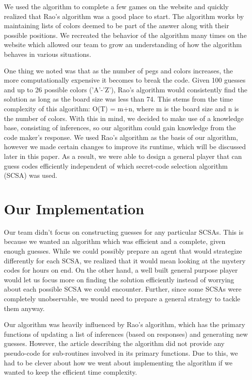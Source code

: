 \documentclass[11pt]{article}
\begin{document}
    We used the algorithm to complete a few games on the website and quickly realized that Rao's algorithm was a good place to start. The algorithm works by maintaining lists of colors deemed to be part of the answer along with their possible positions. We recreated the behavior of the algorithm many times on the website\autocite{webgames} which allowed our team to grow an understanding of how the algorithm behaves in various situations.

    One thing we noted was that as the number of pegs and colors increases, the more computationally expensive it becomes to break the code. Given 100 guesses and up to 26 possible colors ('A'-'Z'), Rao’s algorithm would consistently find the solution as long as the board size was less than 74. This stems from the time complexity of this algorithm: O(T) = m+n, where m is the board size and n is the number of colors. With this in mind, we decided to make use of a knowledge base, consisting of inferences, so our algorithm could gain knowledge from the code maker’s response. We used Rao’s algorithm as the basis of our algorithm, however we made certain changes to improve its runtime, which will be discussed later in this paper. As a result, we were able to design a general player that can guess codes efficiently independent of which secret-code selection algorithm (SCSA) was used.

    \section{Our Implementation}

    Our team didn’t focus on constructing guesses for any particular SCSAs. This is because we wanted an algorithm which was efficient and a complete, given enough guesses. While we could possibly prepare an agent that would strategize differently for each SCSA, we realized that it would mean looking at the mystery codes for hours on end. On the other hand, a well built general purpose player would let us focus more on finding the solution efficiently instead of worrying about each possible SCSA we could encounter. Further, since some SCSAs were completely unobservable, we would need to prepare a general strategy to tackle them anyway.

    Our algorithm was heavily influenced by Rao’s algorithm, which has the primary functions of updating a list of inferences (based on responses) and generating new guesses. However, the article describing the algorithm did not provide any pseudo-code for sub-routines involved in its primary functions. Due to this, we had to be clever about how we went about implementing the algorithm if we wanted to keep the efficient time complexity. 
    
\end{document}
